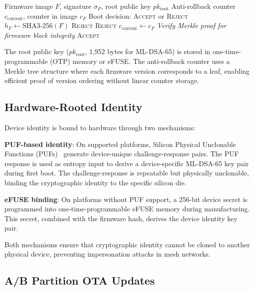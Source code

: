 \documentclass[conference,10pt]{IEEEtran}
\newcommand{\mldsa}{\textrm{ML-DSA}}
\begin{document}
\begin{algorithm}[t]
\caption{PQ Secure Boot Verification}
\label{alg:boot}
\begin{algorithmic}[1]
\REQUIRE Firmware image $F$, signature $\sigma_F$, root public key $pk_{\text{root}}$
\REQUIRE Anti-rollback counter $c_{\text{current}}$, counter in image $c_F$
\ENSURE Boot decision: \textsc{Accept} or \textsc{Reject}
\STATE $h_F \gets \text{SHA3-256}(F)$
\IF{$\neg\,\mldsa\text{-65.Verify}(pk_{\text{root}}, h_F \| c_F, \sigma_F)$}
  \RETURN \textsc{Reject} 
\ENDIF
{}
  \RETURN \textsc{Reject} 
\ENDIF
\STATE $c_{\text{current}} \gets c_F$ 
\STATE \textit{Verify Merkle proof for firmware block integrity}
\RETURN \textsc{Accept}
\end{algorithmic}
\end{algorithm}

The root public key ($pk_{\text{root}}$, 1,952 bytes for ML-DSA-65) is stored in one-time-programmable (OTP) memory or eFUSE. The anti-rollback counter uses a Merkle tree structure where each firmware version corresponds to a leaf, enabling efficient proof of version ordering without linear counter storage.

\subsection{Hardware-Rooted Identity}

Device identity is bound to hardware through two mechanisms:

\textbf{PUF-based identity}: On supported platforms, Silicon Physical Unclonable Functions (PUFs)~\cite{puf_suh2007} generate device-unique challenge-response pairs. The PUF response is used as entropy input to derive a device-specific ML-DSA-65 key pair during first boot. The challenge-response is repeatable but physically unclonable, binding the cryptographic identity to the specific silicon die.

\textbf{eFUSE binding}: On platforms without PUF support, a 256-bit device secret is programmed into one-time-programmable eFUSE memory during manufacturing. This secret, combined with the firmware hash, derives the device identity key pair.

Both mechanisms ensure that cryptographic identity cannot be cloned to another physical device, preventing impersonation attacks in mesh networks.

\subsection{A/B Partition OTA Updates}
\end{document}
